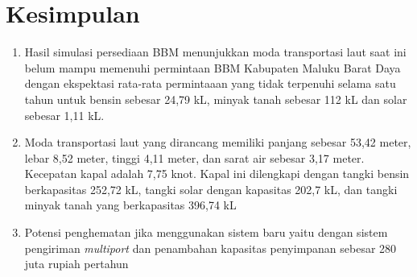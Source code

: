 \section{Kesimpulan}
\label{sec:kesimpulan}

\begin{enumerate}
    \item Hasil simulasi persediaan BBM menunjukkan moda transportasi laut saat ini belum mampu memenuhi permintaan BBM Kabupaten Maluku Barat Daya dengan ekspektasi rata-rata permintaaan yang tidak terpenuhi selama satu tahun untuk bensin sebesar 24,79 kL, minyak tanah sebesar 112 kL dan solar sebesar 1,11 kL.
    \item Moda transportasi laut yang dirancang  memiliki panjang sebesar 53,42 meter, lebar 8,52 meter, tinggi 4,11 meter, dan sarat air sebesar 3,17 meter. Kecepatan kapal adalah 7,75 knot. Kapal ini dilengkapi dengan tangki bensin berkapasitas 252,72 kL, tangki solar dengan kapasitas 202,7 kL, dan tangki minyak tanah yang berkapasitas 396,74 kL
    \item Potensi penghematan jika menggunakan sistem baru yaitu dengan sistem pengiriman \emph{multiport} dan penambahan kapasitas penyimpanan sebesar 280 juta rupiah pertahun
\end{enumerate}